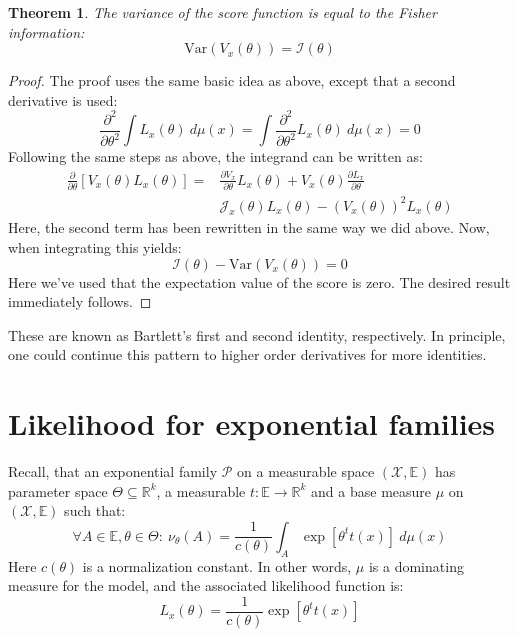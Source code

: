 \documentclass[12pt, a4paper]{article}
\newtheorem{theorem}{Theorem}[section]
\numberwithin{equation}{section}
\begin{document}
\begin{theorem}
The variance of the score function is equal to the Fisher information:
\begin{equation}
\textrm{Var}(V_x(\theta))=\mathcal{I}(\theta)
\end{equation}
\end{theorem}
\begin{proof}
The proof uses the same basic idea as above, except that a second derivative is used:
\begin{equation}
\frac{\partial^2}{\partial\theta^2}\int L_x(\theta)\ d\mu(x)=\int\frac{\partial^2}{\partial\theta^2}L_x(\theta)\ d\mu(x)=0
\end{equation}
Following the same steps as above, the integrand can be written as:
\begin{align}
\frac{\partial}{\partial\theta}\left[V_x(\theta)L_x(\theta)\right]=&\frac{\partial V_x}{\partial\theta}L_x(\theta)+V_x(\theta)\frac{\partial L_x}{\partial\theta} \\
&\mathcal{J}_x(\theta)L_x(\theta)-\left(V_x(\theta)\right)^2 L_x(\theta)
\end{align}
Here, the second term has been rewritten in the same way we did above. Now, when integrating this yields:
\begin{equation}
\mathcal{I}(\theta)-\textrm{Var}(V_x(\theta))=0
\end{equation}
Here we've used that the expectation value of the score is zero. The desired result immediately follows.
\end{proof}

These are known as Bartlett's first and second identity, respectively. In principle, one could continue this pattern to higher order derivatives for more identities.

\section{Likelihood for exponential families}
Recall, that an exponential family $\mathcal{P}$ on a measurable space $(\mathcal{X},\mathbb{E})$ has parameter space $\Theta\subseteq\mathbb{R}^k$, a measurable $t:\mathbb{E}\rightarrow\mathbb{R}^k$ and a base measure $\mu$ on $(\mathcal{X},\mathbb{E})$ such that:
\begin{equation}
\forall A\in\mathbb{E}, \theta\in\Theta:\ \nu_\theta(A)=\frac{1}{c(\theta)}\int_A\exp\left[\theta^t t(x)\right]\ d\mu(x)
\end{equation}
Here $c(\theta)$ is a normalization constant. In other words, $\mu$ is a dominating measure for the model, and the associated likelihood function is:
\begin{equation}
L_x(\theta)=\frac{1}{c(\theta)}\exp[\theta^t t(x)]
\end{equation}
\end{document}
